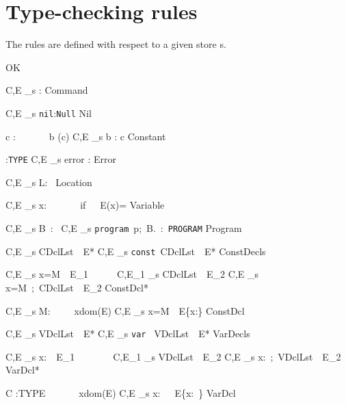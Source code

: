 
\section{Type-checking rules}\label{app::typeassn}

The rules are defined with respect to a given store s.

 {OK}

\axiom
{C,E \vdash_s \com:\Com}
{Command}

\axiom
{C,E \vdash_s \texttt{nil}:\texttt{Null}}
{Nil}

\infrule
{\emptyset \vdash c :\TP\ \ \ \ \ \ \ b \in \Im (c)}
{C,E \vdash_s b : c }
{}{Constant}

\infrule
{\emptyset \vdash \tau :\texttt{TYPE}}
{C,E \vdash_s error :\tau }
{}{Error}

 {C,E \vdash_s L:\rf\ \tau } {}{Location}


\axiom
{C,E \vdash_s x:\tau \ \ \ \ \ \ \ if\ \ \ E(x)=\tau}
{Variable}

\infrule
{C,E \vdash_s B\ :\ \Com}
{C,E \vdash_s \texttt{program}\ p;\ B.\ :\ \texttt{PROGRAM}}
{}{Program}

\infrule
{C,E \vdash_s CDclLst\ \diamond \ E*}
{C,E \vdash_s \texttt{const}\ CDclLst\ \diamond \ E*}
{}{ConstDecls }

\infrule
{C,E \vdash_s x=M\ \diamond \ E_1\ \ \ \ \ \ C,E_1 \vdash_s CDclLst\
\diamond \ E_2}
{C,E \vdash_s x=M\ ;\ CDclLst\ \diamond \ E_2}
{}{ConstDcl* }

\infrule
{C,E \vdash_s M:\tau \ \ \ \ \ x\notin dom(E)}
{C,E \vdash_s x=M\ \diamond \ E\cup \{x:\tau \}}
{}{ConstDcl }

\infrule
{C,E \vdash_s VDclLst\ \diamond \ E*}
{C,E \vdash_s \texttt{var} \ VDclLst\ \diamond \ E*}
{}{VarDecls }

\infrule
{C,E \vdash_s x:\tau \ \diamond \ E_1\ \ \ \ \ \ \ \ C,E_1 \vdash_s
VDclLst\ \diamond \ E_2}
{C,E \vdash_s x:\tau \ ;\ VDclLst\ \diamond \ E_2}
{}{VarDcl* }

\infrule
{C \vdash \tau :TYPE\ \ \ \ \ \ \ x\notin dom(E)}
{C,E \vdash_s x:\tau \ \ \diamond \ E\cup \{x:\rf\ \tau \}}
{}{VarDcl }


